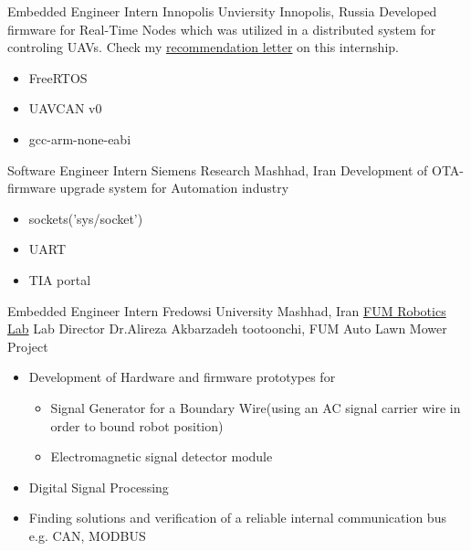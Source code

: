         {Embedded Engineer Intern}
        {Innopolis Unviersity}
        {Innopolis, Russia}
        {
        \newline
        Developed firmware for Real-Time Nodes which was utilized in a distributed system for controling UAVs. Check my \href{https://drive.google.com/file/d/1Msw5tk7niDSDpVlNeaLCsUIQxlgREYcV/view?usp=sharing}{\color{blue} recommendation letter} on this internship.
        }
        {
        \begin{itemize}
            \item FreeRTOS
            \item UAVCAN v0
            \item gcc-arm-none-eabi
        \end{itemize}
        }


        {Software Engineer Intern}
        {Siemens Research}
        {Mashhad, Iran}
        {
        \newline
        Development of OTA-firmware upgrade system for Automation industry} 
        {
        \begin{itemize}
            \item sockets('sys/socket')
            \item UART
            \item TIA portal 
        \end{itemize}
        }

    {Embedded Engineer Intern}
    {Fredowsi University}
    {Mashhad, Iran}
    {
    \newline
    \href{https://www.fumrobotics.ir/people/}{\color{blue}FUM Robotics Lab}
    Lab Director Dr.Alireza Akbarzadeh tootoonchi, FUM Auto Lawn Mower Project
    }
    {
    \begin{itemize}
    \item Development of Hardware and firmware prototypes for 
        \begin{itemize}
            \item  Signal Generator for a Boundary Wire(using an AC signal carrier wire in order to bound robot position)
            \item  Electromagnetic signal detector module
        \end{itemize}
    \item Digital Signal Processing
    \item Finding solutions and verification of a reliable internal communication bus e.g. CAN, MODBUS
    \end{itemize}
    }


